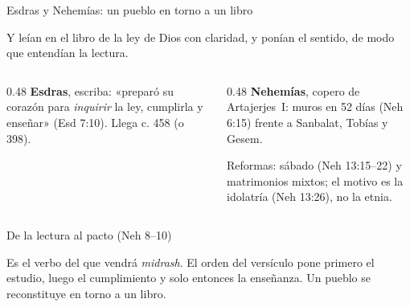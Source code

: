 \begin{frame}{Esdras y Nehemías: un pueblo en torno a un libro}
\par\smallskip
\begin{cita}Y leían en el libro de la ley de Dios con claridad, y ponían el sentido, de modo que entendían la lectura.\end{cita}
\vspace{8pt}
\begin{columns}[T,onlytextwidth]
\begin{column}{0.48\textwidth}\footnotesize
\textbf{\textcolor{ladrillo}{Esdras}}, escriba: «preparó su corazón para \emph{inquirir} la ley, cumplirla y enseñar» (Esd 7:10). Llega c. 458 (o 398).
\end{column}
\begin{column}{0.48\textwidth}\footnotesize
\textbf{\textcolor{ladrillo}{Nehemías}}, copero de Artajerjes~I: muros en 52 días (Neh 6:15) frente a Sanbalat, Tobías y Gesem.\par\smallskip
Reformas: sábado (Neh 13:15--22) y matrimonios mixtos; el motivo es la idolatría (Neh 13:26), no la etnia.
\end{column}
\end{columns}
\end{frame}

\begin{frame}{De la lectura al pacto (Neh 8--10)}
\centering
{}
\elabpropia
\vspace{8pt}
\begin{notalam}
\footnotesize Es el verbo del que vendrá \emph{midrash}. El orden del versículo pone primero el estudio, luego el cumplimiento y solo entonces la enseñanza. Un pueblo se reconstituye en torno a un libro.
\end{notalam}
\end{frame}

